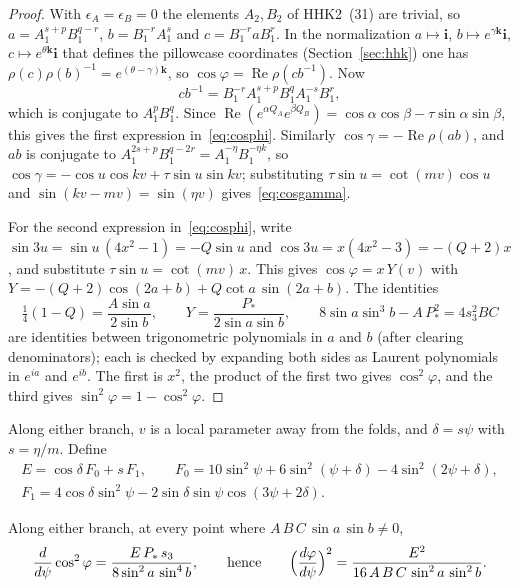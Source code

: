 \begin{proof}
With $\epsilon_A=\epsilon_B=0$ the elements $A_2,B_2$ of HHK2~(31) are trivial, so
$a=A_1^{s+p}B_1^{q-r}$, $b=B_1^{-r}A_1^{s}$ and $c=B_1^{-r}aB_1^{r}$. In the normalization $a\mapsto\mathbf i$,
$b\mapsto e^{\gamma\mathbf k}\mathbf i$, $c\mapsto e^{\theta\mathbf k}\mathbf i$ that defines the pillowcase coordinates (Section~\ref{sec:hhk}) one has
$\rho(c)\rho(b)^{-1}=e^{(\theta-\gamma)\mathbf k}$, so $\cos\varphi=\operatorname{Re}\rho(cb^{-1})$. Now
\[
cb^{-1}=B_1^{-r}A_1^{s+p}B_1^{q}A_1^{-s}B_1^{r},
\]
which is conjugate to $A_1^{p}B_1^{q}$. Since $\operatorname{Re}(e^{\alpha Q_A}e^{\beta Q_B})=\cos\alpha\cos\beta-\tau\sin\alpha\sin\beta$,
this gives the first expression in~\eqref{eq:cosphi}. Similarly $\cos\gamma=-\operatorname{Re}\rho(ab)$, and $ab$ is conjugate to
$A_1^{2s+p}B_1^{q-2r}=A_1^{-\eta}B_1^{-\eta k}$, so $\cos\gamma=-\cos u\cos kv+\tau\sin u\sin kv$; substituting
$\tau\sin u=\cot(mv)\cos u$ and $\sin(kv-mv)=\sin(\eta v)$ gives~\eqref{eq:cosgamma}.

For the second expression in~\eqref{eq:cosphi}, write $\sin3u=\sin u\,(4x^2-1)=-Q\sin u$ and
$\cos3u=x(4x^2-3)=-(Q+2)x$, and substitute $\tau\sin u=\cot(mv)\,x$. This gives $\cos\varphi=x\,Y(v)$ with
$Y=-(Q+2)\cos(2a+b)+Q\cot a\,\sin(2a+b)$. The identities
\[
\tfrac14(1-Q)=\frac{A\sin a}{2\sin b},\qquad Y=\frac{P_*}{2\sin a\sin b},\qquad 8\sin a\sin^3b-A\,P_*^2=4s_3^2BC
\]
are identities between trigonometric polynomials in $a$ and $b$ (after clearing denominators); each is checked by
expanding both sides as Laurent polynomials in $e^{ia}$ and $e^{ib}$. The first is $x^2$, the product of the first two
gives $\cos^2\varphi$, and the third gives $\sin^2\varphi=1-\cos^2\varphi$.
\end{proof}

Along either branch, $v$ is a local parameter away from the folds, and $\delta=s\psi$ with $s=\eta/m$. Define
\begin{gather*}
E=\cos\delta\,F_0+s\,F_1,\qquad F_0=10\sin^2\psi+6\sin^2(\psi+\delta)-4\sin^2(2\psi+\delta),\\
F_1=4\cos\delta\sin^2\psi-2\sin\delta\sin\psi\cos(3\psi+2\delta).
\end{gather*}

\begin{lemma}\label{lem:deriv}
Along either branch, at every point where $A\,B\,C\,\sin a\,\sin b\neq0$,
\begin{equation}\label{eq:deriv}
\frac{d}{d\psi}\cos^2\varphi=\frac{E\,P_*\,s_3}{8\sin^2a\,\sin^4b},\qquad\text{hence}\qquad
\Bigl(\frac{d\varphi}{d\psi}\Bigr)^2=\frac{E^2}{16\,A\,B\,C\,\sin^2a\,\sin^2b}.
\end{equation}
\end{lemma}

